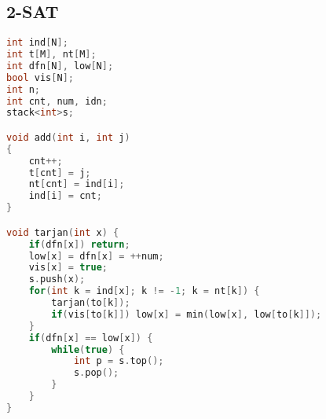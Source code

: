 ﻿\subsection{2-SAT}
    \begin{lstlisting}[language=C++]
int ind[N];
int t[M], nt[M];
int dfn[N], low[N];
bool vis[N];
int n;
int cnt, num, idn;
stack<int>s;

void add(int i, int j)
{
    cnt++;
    t[cnt] = j;
    nt[cnt] = ind[i];
    ind[i] = cnt;
}

void tarjan(int x) {
	if(dfn[x]) return;
	low[x] = dfn[x] = ++num;
	vis[x] = true;
	s.push(x);
	for(int k = ind[x]; k != -1; k = nt[k]) {
		tarjan(to[k]);
		if(vis[to[k]]) low[x] = min(low[x], low[to[k]]);
	}
	if(dfn[x] == low[x]) {
		while(true) {
			int p = s.top();
			s.pop();
		}
	}
}
    \end{lstlisting}
